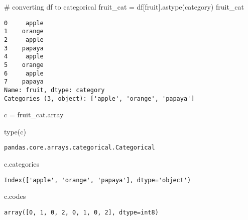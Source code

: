 \documentclass[
  letterpaper,
  DIV=11,
  numbers=noendperiod]{scrreprt}
\newenvironment{Shaded}{\begin{snugshade}}{\end{snugshade}}
\newcommand{\BuiltInTok}[1]{\textcolor[rgb]{0.00,0.23,0.31}{#1}}
\newcommand{\CommentTok}[1]{\textcolor[rgb]{0.37,0.37,0.37}{#1}}
\newcommand{\NormalTok}[1]{\textcolor[rgb]{0.00,0.23,0.31}{#1}}
\newcommand{\OperatorTok}[1]{\textcolor[rgb]{0.37,0.37,0.37}{#1}}
\newcommand{\StringTok}[1]{\textcolor[rgb]{0.13,0.47,0.30}{#1}}
\begin{document}
\begin{Shaded}
\begin{Highlighting}[]
\CommentTok{\# converting df to categorical}
\NormalTok{fruit\_cat }\OperatorTok{=}\NormalTok{ df[}\StringTok{\textquotesingle{}fruit\textquotesingle{}}\NormalTok{].astype(}\StringTok{\textquotesingle{}category\textquotesingle{}}\NormalTok{)}
\NormalTok{fruit\_cat}
\end{Highlighting}
\end{Shaded}

\begin{verbatim}
0     apple
1    orange
2     apple
3    papaya
4     apple
5    orange
6     apple
7    papaya
Name: fruit, dtype: category
Categories (3, object): ['apple', 'orange', 'papaya']
\end{verbatim}

\begin{Shaded}
\begin{Highlighting}[]
\NormalTok{c }\OperatorTok{=}\NormalTok{ fruit\_cat.array}
\end{Highlighting}
\end{Shaded}

\begin{Shaded}
\begin{Highlighting}[]
\BuiltInTok{type}\NormalTok{(c)}
\end{Highlighting}
\end{Shaded}

\begin{verbatim}
pandas.core.arrays.categorical.Categorical
\end{verbatim}

\begin{Shaded}
\begin{Highlighting}[]
\NormalTok{c.categories}
\end{Highlighting}
\end{Shaded}

\begin{verbatim}
Index(['apple', 'orange', 'papaya'], dtype='object')
\end{verbatim}

\begin{Shaded}
\begin{Highlighting}[]
\NormalTok{c.codes}
\end{Highlighting}
\end{Shaded}

\begin{verbatim}
array([0, 1, 0, 2, 0, 1, 0, 2], dtype=int8)
\end{verbatim}
\end{document}
